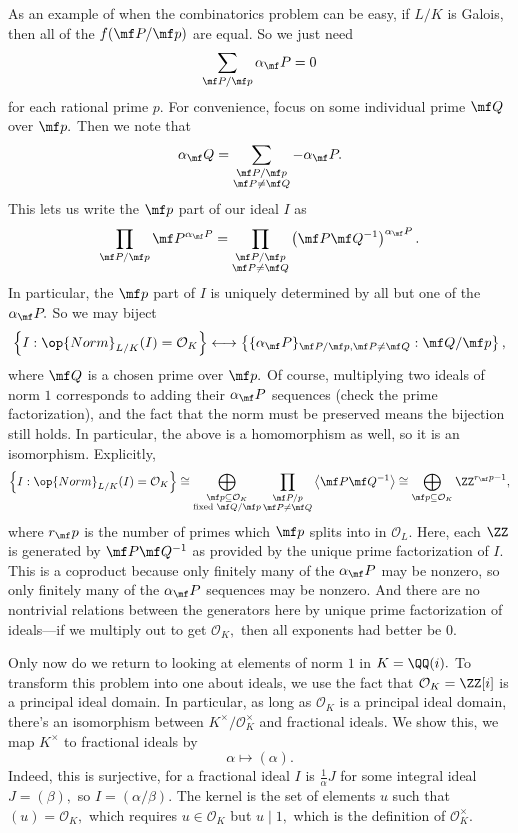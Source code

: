 As an example of when the combinatorics problem can be easy, if $L/K$ is Galois, then all of the $f(\mf P/\mf p)$ are equal. So we just need
\[\sum_{\mf P/\mf p}\alpha_\mf P=0\]
for each rational prime $p.$ For convenience, focus on some individual prime $\mf Q$ over $\mf p.$ Then we note that
\[\alpha_\mf Q=\sum_{\substack{\mf P/\mf p\\\mf P\ne\mf Q}}-\alpha_\mf P.\]
This lets us write the $\mf p$ part of our ideal $I$ as
\[\prod_{\mf P/\mf p}\mf P^{\alpha_\mf P}=\prod_{\substack{\mf P/\mf p\\\mf P\ne\mf Q}}\left(\mf P\mf Q^{-1}\right)^{\alpha_\mf P}.\]
In particular, the $\mf p$ part of $I$ is uniquely determined by all but one of the $\alpha_\mf P.$ So we may biject
\[\left\{I:\op{Norm}_{L/K}(I)=\mathcal O_K\right\}\longleftrightarrow\left\{\{\alpha_\mf P\}_{\mf P/\mf p,\mf P\ne\mf Q}:\mf Q/\mf p\right\},\]
where $\mf Q$ is a chosen prime over $\mf p.$ Of course, multiplying two ideals of norm $1$ corresponds to adding their $\alpha_\mf P$ sequences (check the prime factorization), and the fact that the norm must be preserved means the bijection still holds. In particular, the above is a homomorphism as well, so it is an isomorphism. Explicitly,
\[\left\{I:\op{Norm}_{L/K}(I)=\mathcal O_K\right\}\cong\bigoplus_{\substack{\mf p\subseteq\mathcal O_K\\\text{fixed }\mf Q/\mf p}}\prod_{\substack{\mf P/p\\\mf P\ne\mf Q}}\left\langle\mf P\mf Q^{-1}\right\rangle\cong\bigoplus_{\mf p\subseteq\mathcal O_K}\ZZ^{r_\mf p-1},\]
where $r_\mf p$ is the number of primes which $\mf p$ splits into in $\mathcal O_L.$ Here, each $\ZZ$ is generated by $\mf P\mf Q^{-1}$ as provided by the unique prime factorization of $I.$ This is a coproduct because only finitely many of the $\alpha_\mf P$ may be nonzero, so only finitely many of the $\alpha_\mf P$ sequences may be nonzero. And there are no nontrivial relations between the generators here by unique prime factorization of ideals---if we multiply out to get $\mathcal O_K,$ then all exponents had better be $0.$

Only now do we return to looking at elements of norm $1$ in $K=\QQ(i).$ To transform this problem into one about ideals, we use the fact that $\mathcal O_K=\ZZ[i]$ is a principal ideal domain. In particular, as long as $\mathcal O_K$ is a principal ideal domain, there's an isomorphism between $K^\times/\mathcal O_K^\times$ and fractional ideals. We show this, we map $K^\times$ to fractional ideals by
\[\alpha\mapsto(\alpha).\]
Indeed, this is surjective, for a fractional ideal $I$ is $\frac1\alpha J$ for some integral ideal $J=(\beta),$ so $I=(\alpha/\beta).$ The kernel is the set of elements $u$ such that $(u)=\mathcal O_K,$ which requires $u\in\mathcal O_K$ but $u\mid1,$ which is the definition of $\mathcal O_K^\times.$

